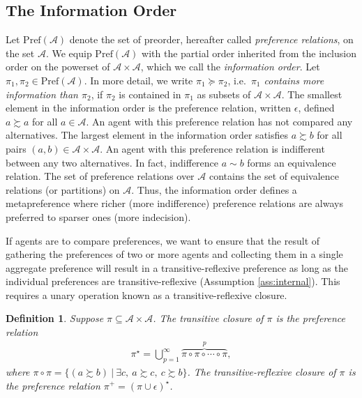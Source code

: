 \documentclass[conference]{ieeeconf}
\newcommand{\A}{\mathcal{A}}
\newcommand{\Pref}{\mathrm{Pref}}
\renewcommand{\L}{\mathcal{L}}
\newcommand{\prefers}{\succsim}
\DeclareMathOperator{\Atoms}{At}
\newtheorem{definition}{Definition}
\begin{document}


\subsection{The Information Order}

Let $\Pref(\A)$ denote the set of preorder, hereafter called \emph{preference relations}, on the set $\A$. We equip $\Pref(\A)$ with the partial order inherited from the inclusion order on the powerset of $\A \times \A$, which we call the \emph{information order}. Let $\pi_1, \pi_2 \in \Pref(\A)$. In more detail, we write $\pi_1 \succeq \pi_2$, i.e.~{\it $\pi_1$ contains more information than $\pi_2$}, if $\pi_2$ is contained in $\pi_1$ as subsets of $\A \times \A$. The smallest element in the information order is the preference relation, written $\epsilon$, defined $a \prefers a$ for all $a \in \A$. An agent with this preference relation has not compared any alternatives. The largest element in the information order satisfies $a \prefers b$ for all pairs $(a,b) \in \A \times \A$. An agent with this preference relation is indifferent between any two alternatives. In fact, indifference $a \sim b$ forms an equivalence relation. The set of preference relations over $\A$ contains the set of equivalence relations (or partitions) on $\A$. Thus, the information order defines a metapreference where richer (more indifference) preference relations are always preferred to sparser ones (more indecision).

If agents are to compare preferences, we want to ensure that the result of gathering the preferences of two or more agents and collecting them in a single aggregate preference will result in a transitive-reflexive preference as long as the individual preferences are transitive-reflexive (Assumption \ref{ass:internal}). This requires a unary operation known as a transitive-reflexive closure.
\begin{definition}
    Suppose $\pi \subseteq \A \times \A$. The \emph{transitive closure} of $\pi$ is the preference relation 
\begin{align}
    \pi^{\star} = \bigcup_{p=1}^{\infty} \overbrace{\pi \circ \pi \circ \cdots \circ \pi}^{p}, \label{eq:transitive-closure}
\end{align}
where $\pi \circ \pi = \{ (a \prefers b)~\vert~\exists c,~a \prefers c,~c \prefers b\}$. The \emph{transitive-reflexive closure} of $\pi$ is the preference relation $\pi^{+} = \left( \pi \cup \epsilon \right)^\star$.
\end{definition}
\end{document}

